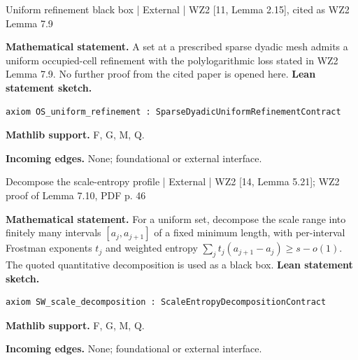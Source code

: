 \documentclass[10pt,a4paper]{article}
\begin{document}
\begin{minipage}{\linewidth}
\hypertarget{node-XOSuniform}{}
\begin{tcolorbox}[colback=white,colframe=externalfg,colbacktitle=externalbg,coltitle=ink,boxrule=0.45pt,arc=1.6mm,left=3mm,right=3mm,top=2mm,bottom=2mm,title={\sffamily\bfseries External: Orponen-Shmerkin Lem. 2.15 \hfill \texttt{XOSuniform}}]
{\sffamily\small\color{muted}Uniform refinement black box | External | WZ2 [11, Lemma 2.15], cited as WZ2 Lemma 7.9}\par
\textbf{Mathematical statement.} A set at a prescribed sparse dyadic mesh admits a uniform occupied-cell refinement with the polylogarithmic loss stated in WZ2 Lemma 7.9.
No further proof from the cited paper is opened here.
\smallskip\textbf{Lean statement sketch.}
\begin{Verbatim}[fontsize=\small,breaklines=true,breakanywhere=true,tabsize=2]
axiom OS_uniform_refinement : SparseDyadicUniformRefinementContract
\end{Verbatim}
{\footnotesize\textbf{Mathlib support.} F, G, M, Q.\par
\textbf{Incoming edges.} None; foundational or external interface.\par}

\end{tcolorbox}\end{minipage}\par\medskip
\begin{minipage}{\linewidth}
\hypertarget{node-XSWdecomp}{}
\begin{tcolorbox}[colback=white,colframe=externalfg,colbacktitle=externalbg,coltitle=ink,boxrule=0.45pt,arc=1.6mm,left=3mm,right=3mm,top=2mm,bottom=2mm,title={\sffamily\bfseries External: Shmerkin-Wang Lem. 5.21 \hfill \texttt{XSWdecomp}}]
{\sffamily\small\color{muted}Decompose the scale-entropy profile | External | WZ2 [14, Lemma 5.21]; WZ2 proof of Lemma 7.10, PDF p. 46}\par
\textbf{Mathematical statement.} For a uniform set, decompose the scale range into finitely many intervals $[a_j,a_{j+1}]$ of a fixed minimum length, with per-interval Frostman exponents $t_j$ and weighted entropy
$\sum_jt_j(a_{j+1}-a_j)\ge s-o(1)$.
The quoted quantitative decomposition is used as a black box.
\smallskip\textbf{Lean statement sketch.}
\begin{Verbatim}[fontsize=\small,breaklines=true,breakanywhere=true,tabsize=2]
axiom SW_scale_decomposition : ScaleEntropyDecompositionContract
\end{Verbatim}
{\footnotesize\textbf{Mathlib support.} F, G, M, Q.\par
\textbf{Incoming edges.} None; foundational or external interface.\par}

\end{tcolorbox}\end{minipage}\par\medskip
\end{document}
